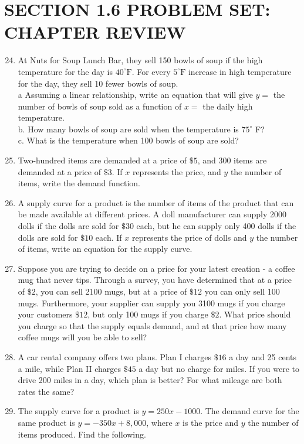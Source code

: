 \section*{SECTION 1.6 PROBLEM SET: CHAPTER REVIEW}
\begin{enumerate}
  \setcounter{enumi}{23}
  \item At Nuts for Soup Lunch Bar, they sell 150 bowls of soup if the high temperature for the day is $40^{\circ} \mathrm{F}$. For every $5^{\circ} \mathrm{F}$ increase in high temperature for the day, they sell 10 fewer bowls of soup.\\
a Assuming a linear relationship, write an equation that will give $y=$ the number of bowls of soup sold as a function of $x=$ the daily high temperature.\\
b. How many bowls of soup are sold when the temperature is $75^{\circ}$ F?\\
c. What is the temperature when 100 bowls of soup are sold?
  \item Two-hundred items are demanded at a price of $\$ 5$, and 300 items are demanded at a price of $\$ 3$. If $x$ represents the price, and $y$ the number of items, write the demand function.
  \item A supply curve for a product is the number of items of the product that can be made available at different prices. A doll manufacturer can supply 2000 dolls if the dolls are sold for $\$ 30$ each, but he can supply only 400 dolls if the dolls are sold for $\$ 10$ each. If $x$ represents the price of dolls and $y$ the number of items, write an equation for the supply curve.
  \item Suppose you are trying to decide on a price for your latest creation - a coffee mug that never tips. Through a survey, you have determined that at a price of $\$ 2$, you can sell 2100 mugs, but at a price of $\$ 12$ you can only sell 100 mugs. Furthermore, your supplier can supply you 3100 mugs if you charge your customers $\$ 12$, but only 100 mugs if you charge $\$ 2$. What price should you charge so that the supply equals demand, and at that price how many coffee mugs will you be able to sell?
  \item A car rental company offers two plans. Plan I charges $\$ 16$ a day and 25 cents a mile, while Plan II charges $\$ 45$ a day but no charge for miles. If you were to drive 200 miles in a day, which plan is better? For what mileage are both rates the same?
  \item The supply curve for a product is $y=250 x-1000$. The demand curve for the same product is $y=-350 x+8,000$, where $x$ is the price and $y$ the number of items produced. Find the following.\\

\end{enumerate}
